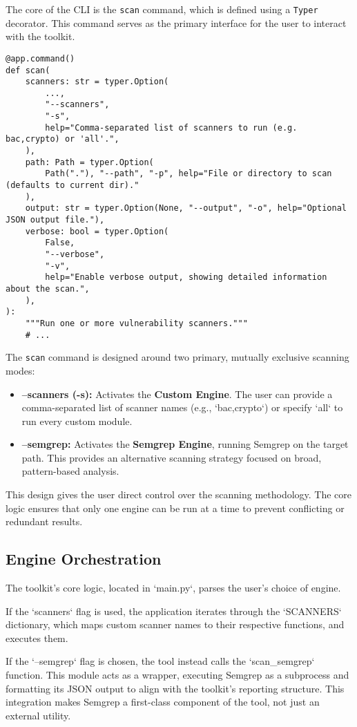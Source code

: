 The core of the CLI is the \texttt{scan} command, which is defined using a \texttt{Typer} decorator. This command serves as the primary interface for the user to interact with the toolkit.

\begin{verbatim}
@app.command()
def scan(
    scanners: str = typer.Option(
        ...,
        "--scanners",
        "-s",
        help="Comma-separated list of scanners to run (e.g. bac,crypto) or 'all'.",
    ),
    path: Path = typer.Option(
        Path("."), "--path", "-p", help="File or directory to scan (defaults to current dir)."
    ),
    output: str = typer.Option(None, "--output", "-o", help="Optional JSON output file."),
    verbose: bool = typer.Option(
        False,
        "--verbose",
        "-v",
        help="Enable verbose output, showing detailed information about the scan.",
    ),
):
    """Run one or more vulnerability scanners."""
    # ...
\end{verbatim}

The \texttt{scan} command is designed around two primary, mutually exclusive scanning modes:
\begin{itemize}
    \item \textbf{--scanners (-s):} Activates the \textbf{Custom Engine}. The user can provide a comma-separated list of scanner names (e.g., `bac,crypto`) or specify `all` to run every custom module.
    \item \textbf{--semgrep:} Activates the \textbf{Semgrep Engine}, running Semgrep on the target path. This provides an alternative scanning strategy focused on broad, pattern-based analysis.
\end{itemize}

This design gives the user direct control over the scanning methodology. The core logic ensures that only one engine can be run at a time to prevent conflicting or redundant results.

\subsection{Engine Orchestration}

The toolkit's core logic, located in `main.py`, parses the user's choice of engine.

If the `scanners` flag is used, the application iterates through the `SCANNERS` dictionary, which maps custom scanner names to their respective functions, and executes them.

If the `--semgrep` flag is chosen, the tool instead calls the `scan_semgrep` function. This module acts as a wrapper, executing Semgrep as a subprocess and formatting its JSON output to align with the toolkit's reporting structure. This integration makes Semgrep a first-class component of the tool, not just an external utility.



